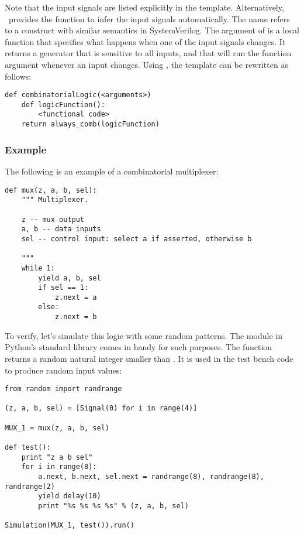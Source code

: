 Note that the input signals are listed explicitly in the
template. Alternatively, \myhdl\ provides the 
function to infer the input signals automatically. The name refers to
a construct with similar semantics in SystemVerilog.  The argument of
 is a local function that specifies
what happens when one of the input signals
changes. It returns a generator that is
sensitive to all inputs, and that will run the function argument
whenever an input changes. Using , the template
can be rewritten as follows:

\begin{verbatim}
def combinatorialLogic(<arguments>)
    def logicFunction():
        <functional code>
    return always_comb(logicFunction)
\end{verbatim}


\subsubsection{Example \label{model-comb-ex}}

The following is an example of a combinatorial multiplexer:

\begin{verbatim}
def mux(z, a, b, sel):
    """ Multiplexer.
    
    z -- mux output
    a, b -- data inputs
    sel -- control input: select a if asserted, otherwise b

    """
    while 1:
        yield a, b, sel
        if sel == 1:
            z.next = a
        else:
            z.next = b
\end{verbatim}

To verify, let's simulate this logic with some random patterns. The
 module in Python's standard library comes in handy for
such purposes. The function  returns a random
natural integer smaller than . It is used in the test bench
code to produce random input values:

\begin{verbatim}
from random import randrange

(z, a, b, sel) = [Signal(0) for i in range(4)]

MUX_1 = mux(z, a, b, sel)

def test():
    print "z a b sel"
    for i in range(8):
        a.next, b.next, sel.next = randrange(8), randrange(8), randrange(2)
        yield delay(10)
        print "%s %s %s %s" % (z, a, b, sel)
        
Simulation(MUX_1, test()).run() 
\end{verbatim}

